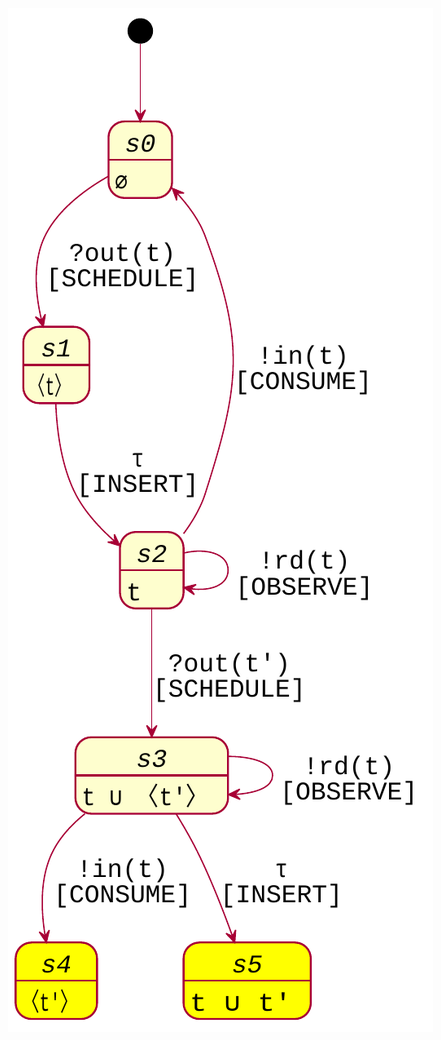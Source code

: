 \documentclass[presentation]{beamer}\mode<presentation>{\usetheme{AMSCesenaPurpleAndGold}}
\begin{document}
\begin{frame}
\begin{columns}
\begin{column}{.25\linewidth}
            \includegraphics[width=\linewidth]{img/ts_lts.pdf}
        \end{column}
    \end{columns}
    
\end{frame}
\end{document}
